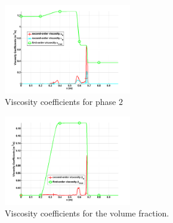 \documentclass{anstrans}
\begin{document}
\begin{figure}[H]								
                \centering
                \includegraphics[width=0.495\textwidth]{plots/relaxation_two_phases_vapor_viscosity_kappa_mu.png}
                \caption{Viscosity coefficients for phase $2$}
                \label{fig:viscosity_coeff_vap}      
\end{figure}
\begin{figure}[H]				
                \centering
                \includegraphics[width=0.495\textwidth]{plots/relaxation_two_phases_liquid_beta.png}
                \caption{Viscosity coefficients for the volume fraction.}
                \label{fig:viscosity_coeff_beta}
\end{figure}
%





\end{document}
